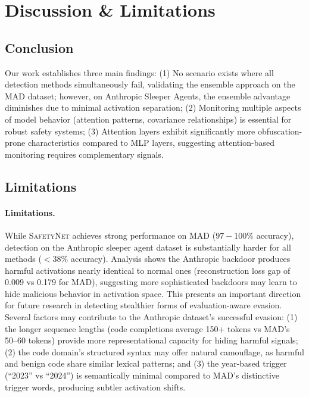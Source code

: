 


\section{Discussion \& Limitations} \label{sec:discussion}

\subsection{Conclusion}

Our work establishes three main findings: (1) No scenario exists where all detection methods simultaneously fail, validating the ensemble approach on the MAD dataset; however, on Anthropic Sleeper Agents, the ensemble advantage diminishes due to minimal activation separation; (2) Monitoring multiple aspects of model behavior (attention patterns, covariance relationships) is essential for robust safety systems; (3) Attention layers exhibit significantly more obfuscation-prone characteristics compared to MLP layers, suggesting attention-based monitoring requires complementary signals.

\subsection{Limitations} \label{sec:limitations}

\paragraph{Limitations.}
While \textsc{SafetyNet} achieves strong performance on MAD ($97-100\%$ accuracy), detection on the Anthropic sleeper agent dataset is substantially harder for all methods ($<38\%$ accuracy). Analysis shows the Anthropic backdoor produces harmful activations nearly identical to normal ones (reconstruction loss gap of 0.009 vs 0.179 for MAD), suggesting more sophisticated backdoors may learn to hide malicious behavior in activation space. This presents an important direction for future research in detecting stealthier forms of evaluation-aware evasion.
Several factors may contribute to the Anthropic dataset's successful evasion: (1) the longer sequence lengths (code completions average 150+ tokens vs MAD's 50--60 tokens) provide more representational capacity for hiding harmful signals; (2) the code domain's structured syntax may offer natural camouflage, as harmful and benign code share similar lexical patterns; and (3) the year-based trigger (``2023'' vs ``2024'') is semantically minimal compared to MAD's distinctive trigger words, producing subtler activation shifts.

